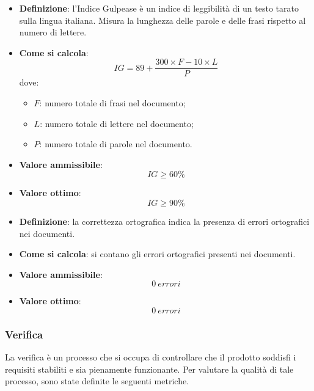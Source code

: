 \begin{itemize}
	\item \textbf{Definizione}: l'Indice Gulpease è un indice di leggibilità di un testo tarato sulla lingua italiana. Misura la lunghezza delle parole e delle frasi rispetto al numero di lettere.
	\item \textbf{Come si calcola}: \begin{equation*}IG = 89 + \frac{300 \times F - 10 \times L}{P}\end{equation*} dove:
		\begin{itemize}
			\item $F$: numero totale di frasi nel documento;
			\item $L$: numero totale di lettere nel documento;
			\item $P$: numero totale di parole nel documento.
		\end{itemize}
	\item \textbf{Valore ammissibile}: \begin{equation*}IG \geq 60\%\end{equation*}
	\item \textbf{Valore ottimo}: \begin{equation*}IG \geq 90\%\end{equation*}
\end{itemize}

\begin{itemize}
	\item \textbf{Definizione}: la correttezza ortografica indica la presenza di errori ortografici nei documenti.
	\item \textbf{Come si calcola}: si contano gli errori ortografici presenti nei documenti.
	\item \textbf{Valore ammissibile}: \begin{equation*}0\ errori\end{equation*}
	\item \textbf{Valore ottimo}: \begin{equation*}0\ errori\end{equation*}
\end{itemize}

\subsubsection{Verifica}
La verifica è un processo che si occupa di controllare che il prodotto soddisfi i requisiti stabiliti
e sia pienamente funzionante. Per valutare la qualità di tale processo, sono state definite le seguenti metriche.

